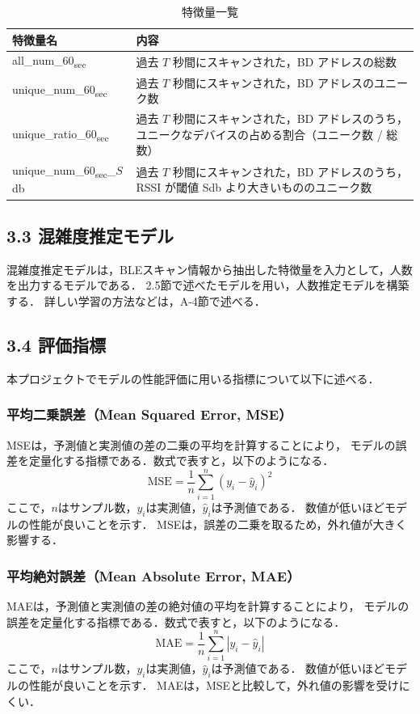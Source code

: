 \begin{table}[tb]
	\centering
	\caption{特徴量一覧}
	\label{tbl:feastures}
	\small
	\doublerulesep=0.3pt
    \begin{tabular}{l|p{5cm}} \hline\hline\hline
		特徴量名 & 内容 \\ \hline
		all\_num\_60\textsubscript{sec} & 過去 $T$ 秒間にスキャンされた，BD アドレスの総数\\ \hline
    unique\_num\_60\textsubscript{sec} & 過去 $T$ 秒間にスキャンされた，BD アドレスのユニーク数 \\ \hline
    unique\_ratio\_60\textsubscript{sec} & 過去 $T$ 秒間にスキャンされた，BD アドレスのうち，ユニークなデバイスの占める割合（ユニーク数 / 総数） \\ \hline
    unique\_num\_60\textsubscript{sec}\_$S$db & 過去 $T$ 秒間にスキャンされた，BD アドレスのうち，RSSI が閾値 Sdb より大きいもののユニーク数 \\ \hline\hline\hline
	\end{tabular}
\end{table}

\subsection*{3.3 混雑度推定モデル}
混雑度推定モデルは，BLEスキャン情報から抽出した特徴量を入力として，人数を出力するモデルである．
2.5節で述べたモデルを用い，人数推定モデルを構築する．
詳しい学習の方法などは，A-4節で述べる．

\subsection*{3.4 評価指標}
本プロジェクトでモデルの性能評価に用いる指標について以下に述べる．

\subsubsection*{平均二乗誤差（Mean Squared Error, MSE）}
MSEは，予測値と実測値の差の二乗の平均を計算することにより，
モデルの誤差を定量化する指標である．数式で表すと，以下のようになる．
\begin{equation}
  \label{eq:mse}
  \mathrm{MSE} = \frac{1}{n} \sum_{i=1}^{n} (y_i - \hat{y}_i)^2
\end{equation}
ここで，$n$はサンプル数，$y_i$は実測値，$\hat{y}_i$は予測値である．
数値が低いほどモデルの性能が良いことを示す．
MSEは，誤差の二乗を取るため，外れ値が大きく影響する．

\subsubsection*{平均絶対誤差（Mean Absolute Error, MAE）}
MAEは，予測値と実測値の差の絶対値の平均を計算することにより，
モデルの誤差を定量化する指標である．数式で表すと，以下のようになる．
\begin{equation}
  \label{eq:mae}
  \mathrm{MAE} = \frac{1}{n} \sum_{i=1}^{n} |y_i - \hat{y}_i|
\end{equation}
ここで，$n$はサンプル数，$y_i$は実測値，$\hat{y}_i$は予測値である．
数値が低いほどモデルの性能が良いことを示す．
MAEは，MSEと比較して，外れ値の影響を受けにくい．

